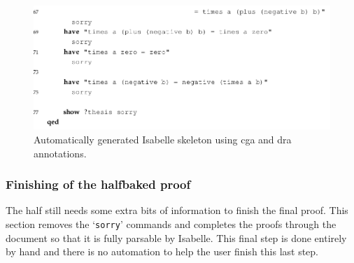 \begin{figure}[H]
\begin{center}
\includegraphics[scale=0.45]{Figures/Background/ringskel4.png}
\end{center}
\caption{Automatically generated Isabelle skeleton using \gls{cga} and \gls{dra} annotations. \label{fig:ringskel}}
\end{figure}

\subsubsection{Finishing of the halfbaked proof}

The \gls{half} still needs some extra bits of information to finish the final
proof. This section removes the `\texttt{sorry}' commands and completes the
proofs through the document so that it is fully parsable by Isabelle. This
final step is done entirely by hand and there is no automation to help the user
finish this last step.


